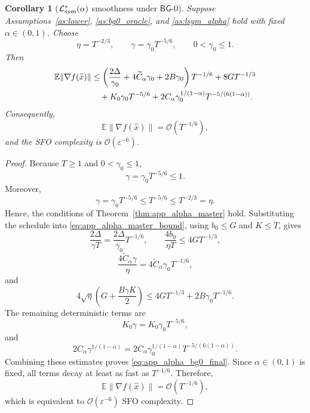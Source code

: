\documentclass[letter,11pt]{article}
\newtheorem{corollary}{Corollary}[theorem]
\newcommand{\E}{\mathbb{E}}
\newcommand{\Ocal}{\mathcal{O}}
\begin{document}
\begin{corollary}[\(\mathcal L_{\rm sym}^*(\alpha)\) smoothness under \(\mathsf{BG}\)-0]
\label{cor:app_alpha_bg0}
Suppose Assumptions~\ref{as:lower}, \ref{as:bg0_oracle}, and
\ref{as:lsym_alpha} hold with fixed \(\alpha\in(0,1)\). Choose
\[
    \eta=T^{-2/3},
    \qquad
    \gamma=\gamma_0T^{-5/6},
    \qquad
    0<\gamma_0\le1.
\]
Then
\begin{align}
\E\|\nabla f(\widehat x)\|
&\le
\left(
    \frac{2\Delta}{\gamma_0}
    +4\widetilde C_\alpha\gamma_0
    +2B\gamma_0
\right)T^{-1/6}
+8GT^{-1/3}
\notag\\
&\quad
+K_0\gamma_0T^{-5/6}
+2C_\alpha\gamma_0^{1/(1-\alpha)}
T^{-5/(6(1-\alpha))}.
\label{eq:app_alpha_bg0_final}
\end{align}
Consequently,
\[
    \E\|\nabla f(\widehat x)\|
    =
    \Ocal(T^{-1/6}),
\]
and the SFO complexity is \(\Ocal(\varepsilon^{-6})\).
\end{corollary}

\begin{proof}
Because \(T\ge1\) and \(0<\gamma_0\le1\),
\[
    \gamma=\gamma_0T^{-5/6}\le1.
\]
Moreover,
\[
    \gamma=\gamma_0T^{-5/6}
    \le
    T^{-5/6}
    \le
    T^{-2/3}
    =
    \eta.
\]
Hence, the conditions of Theorem~\ref{thm:app_alpha_master} hold. Substituting
the schedule into \eqref{eq:app_alpha_master_bound}, using \(b_0\le G\) and
\(K\le T\), gives
\[
    \frac{2\Delta}{\gamma T}
    =
    \frac{2\Delta}{\gamma_0}T^{-1/6},
    \qquad
    \frac{4b_0}{\eta T}
    \le
    4GT^{-1/3},
\]
\[
    \frac{4\widetilde C_\alpha\gamma}{\eta}
    =
    4\widetilde C_\alpha\gamma_0T^{-1/6},
\]
and
\[
    4\sqrt\eta
    \left(G+\frac{B\gamma K}{2}\right)
    \le
    4GT^{-1/3}
    +2B\gamma_0T^{-1/6}.
\]
The remaining deterministic terms are
\[
    K_0\gamma
    =
    K_0\gamma_0T^{-5/6},
\]
and
\[
    2C_\alpha\gamma^{1/(1-\alpha)}
    =
    2C_\alpha\gamma_0^{1/(1-\alpha)}
    T^{-5/(6(1-\alpha))}.
\]
Combining these estimates proves \eqref{eq:app_alpha_bg0_final}. Since
\(\alpha\in(0,1)\) is fixed, all terms decay at least as fast as
\(T^{-1/6}\). Therefore,
\[
    \E\|\nabla f(\widehat x)\|
    =
    \Ocal(T^{-1/6}),
\]
which is equivalent to \(\Ocal(\varepsilon^{-6})\) SFO complexity.
\end{proof}

\end{document}

